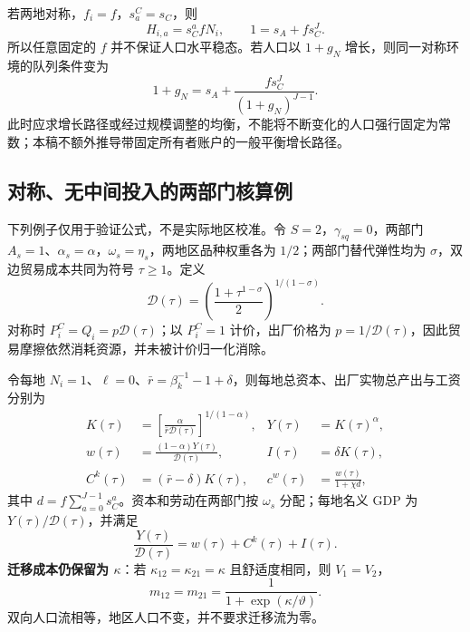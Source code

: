 \documentclass[UTF8,a4paper,zihao=-4,fontset=windows]{ctexart}
\numberwithin{equation}{section}
\newcommand{\pc}{P^{C}}
\newcommand{\invp}{Q}
\begin{document}
若两地对称，$f_i=f$，$s^C_a=s_C$，则
\begin{equation}
 H_{i,a}=s_C^afN_i,\qquad
 1=s_A+fs_C^J.
 \label{eq:stationary-fertility}
\end{equation}
所以任意固定的 $f$ 并不保证人口水平稳态。若人口以 $1+g_N$ 增长，则同一对称环境的队列条件变为
\begin{equation}
 1+g_N=s_A+\frac{fs_C^J}{(1+g_N)^{J-1}}.
 \label{eq:population-growth}
\end{equation}
此时应求增长路径或经过规模调整的均衡，不能将不断变化的人口强行固定为常数；本稿不额外推导带固定所有者账户的一般平衡增长路径。

\subsection{对称、无中间投入的两部门核算例}
下列例子仅用于验证公式，不是实际地区校准。令 $S=2$，$\gamma_{sq}=0$，两部门 $A_s=1$、$\alpha_s=\alpha$，$\omega_s=\eta_s$，两地区品种权重各为 $1/2$；两部门替代弹性均为 $\sigma$，双边贸易成本共同为符号 $\tau\geq1$。定义
\begin{equation}
 \mathcal D(\tau)=\left(\frac{1+\tau^{1-\sigma}}{2}\right)^{1/(1-\sigma)}.
 \label{eq:trade-wedge-example}
\end{equation}
对称时 $\pc_i=\invp_i=p\mathcal D(\tau)$；以 $\pc_i=1$ 计价，出厂价格为 $p=1/\mathcal D(\tau)$，因此贸易摩擦依然消耗资源，并未被计价归一化消除。

令每地 $N_i=1$、$\ell=0$、$\bar r=\beta_k^{-1}-1+\delta$，则每地总资本、出厂实物总产出与工资分别为
\begin{align}
 K(\tau)&=\left[\frac{\alpha}{\bar r\mathcal D(\tau)}\right]^{1/(1-\alpha)},&
 Y(\tau)&=K(\tau)^\alpha,\\
 w(\tau)&=\frac{(1-\alpha)Y(\tau)}{\mathcal D(\tau)},&
 I(\tau)&=\delta K(\tau),\\
 C^k(\tau)&=(\bar r-\delta)K(\tau),&
 c^w(\tau)&=\frac{w(\tau)}{1+\chi d},
 \label{eq:analytic-example}
\end{align}
其中 $d=f\sum_{a=0}^{J-1}s_C^a$。资本和劳动在两部门按 $\omega_s$ 分配；每地名义 GDP 为 $Y(\tau)/\mathcal D(\tau)$，并满足
\begin{equation}
 \frac{Y(\tau)}{\mathcal D(\tau)}=w(\tau)+C^k(\tau)+I(\tau).
\end{equation}
\textbf{迁移成本仍保留为 $\kappa$}：若 $\kappa_{12}=\kappa_{21}=\kappa$ 且舒适度相同，则 $V_1=V_2$，
\begin{equation}
 m_{12}=m_{21}=\frac{1}{1+\exp(\kappa/\vartheta)}.
\end{equation}
双向人口流相等，地区人口不变，并不要求迁移流为零。
\end{document}
